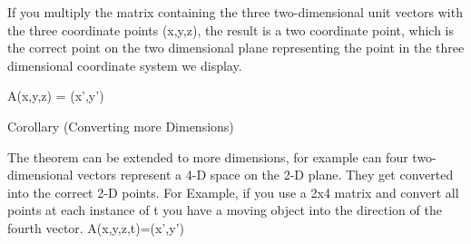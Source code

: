 If you multiply the matrix containing the three two-dimensional unit vectors
with the three coordinate points (x,y,z), the result is a two coordinate point,
which is the correct point on the two dimensional plane representing the point
in the three dimensional coordinate system we display.

A(x,y,z) = (x',y')

Corollary (Converting more Dimensions)

The theorem can be extended to more dimensions, for example can four two-dimensional
vectors represent a 4-D space on the 2-D plane. They get converted into the correct
2-D points. For Example, if you use a 2x4 matrix and convert all points at each 
instance of t you have a moving object into the direction of the fourth vector. 
A(x,y,z,t)=(x',y')

